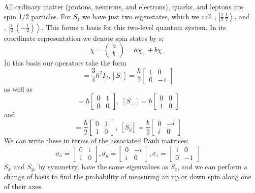 \documentclass[12pt, a4paper, oneside, openright, titlepage]{book}
\newcommand{\ket}[1]{\left\vert#1\right\rangle}
\begin{document}
All ordinary matter (protons, neutrons, and electrons), quarks, and leptons are spin 1/2 particles. For $S_z$ we have just two eigenstates, which we call , $\ket{\frac{1}{2}\,\frac{1}{2}}$, and , $\ket{\frac{1}{2}\,\left(-\frac{1}{2}\right)}$. This forms a basis for this two-level quantum system. In its coordinate representation we denote spin states by s: $$\chi = \begin{pmatrix} a \\ b \end{pmatrix} = a\chi_+ + b\chi_-$$
In this basis our operators take the form \begin{equation*}
    [S^2] = \frac{3}{4}\hbar^2I_2, [S_z] = \frac{\hbar}{2}\begin{bmatrix} 1 & 0 \\ 0 & -1 \end{bmatrix}
\end{equation*}
as well as \begin{equation*}
    [S_+] = \hbar \begin{bmatrix} 0 & 1 \\ 0 & 0 \end{bmatrix},\;[S_-] = \hbar\begin{bmatrix} 0 & 0 \\ 1 & 0 \end{bmatrix}
\end{equation*}
and \begin{equation*}
    [S_x] = \frac{\hbar}{2}\begin{bmatrix} 0 & 1 \\ 1 & 0 \end{bmatrix},\;[S_y] = \frac{\hbar}{2}\begin{bmatrix} 0 & -i \\ i & 0 \end{bmatrix} 
\end{equation*}
We can write these in terms of the associated Pauli matrices: \begin{equation*}
    \sigma_x = \begin{bmatrix} 0 & 1 \\ 1 & 0 \end{bmatrix}, \sigma_y = \begin{bmatrix} 0 & -i \\ i & 0 \end{bmatrix}, \sigma_z = \begin{bmatrix} 1 & 0 \\ 0 & -1 \end{bmatrix}
\end{equation*}
$S_x$ and $S_y$, by symmetry, have the same eigenvalues as $S_z$, and we can perform a change of basis to find the probability of measuring an up or down spin along one of their axes.
\end{document}
